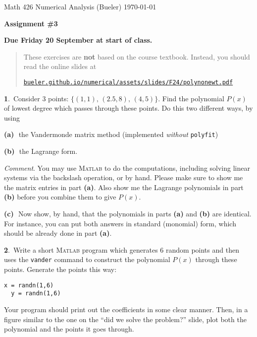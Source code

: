 \documentclass[12pt]{amsart}
\newcommand{\normalspacing}{\renewcommand{\baselinestretch}{1.1}
        \tiny\normalsize}
\newcommand{\prob}[1]{\bigskip\noindent\large\textbf{#1}.\,\normalsize }
\newcommand{\epart}[1]{\medskip\noindent\textbf{(#1)}\,\, }
\newcommand{\Matlab}{\textsc{Matlab}\xspace}
\begin{document}
\scriptsize \noindent Math 426 Numerical Analysis (Bueler) \hfill \today
\normalsize\bigskip

\Large\centerline{\textbf{Assignment \#3}}
\normalsize\medskip

\large
\centerline{\textbf{Due Friday 20 September at start of class.}}
\normalsize\bigskip
\thispagestyle{empty}

\renewcommand{\baselinestretch}{0.5}  \tiny\normalsize
\begin{quote}\small
These exercises are \textbf{not} based on the course textbook.  Instead, you should read the online slides at
  \begin{center}
  \href{https://bueler.github.io/numerical/assets/slides/F24/polynonewt.pdf}{\texttt{bueler.github.io/numerical/assets/slides/F24/polynonewt.pdf}}
  \end{center}
\normalsize
\end{quote}
\normalspacing

\bigskip

\prob{1}  Consider 3 points:  $\{(1,1),\, (2.5,8), \,(4,5)\}$.  Find the polynomial $P(x)$ of lowest degree which passes through these points.  Do this two different ways, by using

\epart{a} the Vandermonde matrix method (implemented \emph{without} \texttt{polyfit})

\epart{b} the Lagrange form.

\medskip\noindent\emph{Comment}.  You may use \Matlab to do the computations, including solving linear systems via the backslash operation, or by hand.  Please make sure to show me the matrix entries in part \textbf{(a)}.  Also show me the Lagrange polynomials in part \textbf{(b)} before you combine them to give $P(x)$.

\epart{c}  Now show, by hand, that the polynomials in parts \textbf{(a)} and \textbf{(b)} are identical.  For instance, you can put both answers in standard (monomial) form, which should be already done in part \textbf{(a)}.


\prob{2}  Write a short \Matlab program which generates 6 random points and then uses the \texttt{vander} command to construct the polynomial $P(x)$ through these points.  Generate the points this way:
\begin{Verbatim}[frame=single,fontfamily=courier,fontsize=\scriptsize]
  x = randn(1,6)
  y = randn(1,6)
\end{Verbatim}
Your program should print out the coefficients in some clear manner.  Then, in a figure similar to the one on the ``did we solve the problem?'' slide, plot both the polynomial and the points it goes through.
\end{document}
